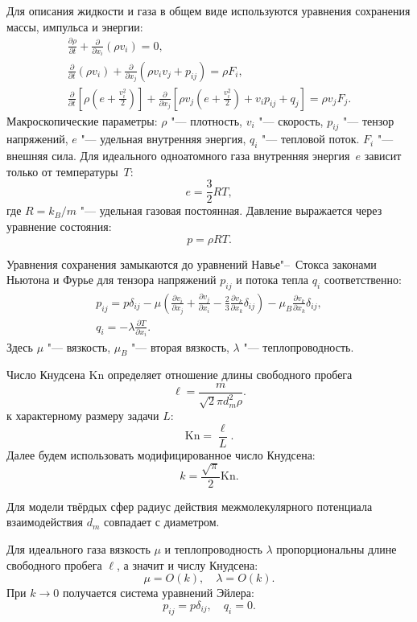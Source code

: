 \documentclass[english,russian,a4paper,10pt]{article}
\newcommand{\Kn}{\mathrm{Kn}}
\newcommand{\pder}[2][]{\frac{\partial#1}{\partial#2}}
\begin{document}
Для описания жидкости и газа в общем виде используются уравнения сохранения массы, импульса и энергии:
\begin{gather}
	\pder[\rho]{t} + \pder{x_i}(\rho v_i) = 0, \label{eq:mass}\\
	\pder{t}(\rho v_i) + \pder{x_j}(\rho v_i v_j + p_{ij}) = \rho F_i, \label{eq:momentum}\\
	\pder{t}\left[\rho\left(e+\frac{v_i^2}2\right)\right] +
		\pder{x_j}\left[\rho v_j\left(e+\frac{v_i^2}2\right)+v_i p_{ij}+q_j\right] = \rho v_j F_j. \label{eq:energy}
\end{gather}
Макроскопические параметры: \(\rho\) "--- плотность, \(v_i\) "--- скорость, \(p_{ij}\) "--- тензор напряжений,
\(e\) "--- удельная внутренняя энергия, \(q_i\) "--- тепловой поток. \(F_i\) "--- внешняя сила.
Для идеального одноатомного газа внутренняя энергия~\(e\) зависит только от температуры~\(T\):
\[ e = \frac32RT,\]
где \(R=k_B/m\) "--- удельная газовая постоянная. Давление выражается через уравнение состояния:
\[ p = \rho RT. \]

Уравнения сохранения замыкаются до уравнений Навье"--~Стокса законами Ньютона и Фурье
для тензора напряжений \(p_{ij}\) и потока тепла \(q_i\) соответственно:
\begin{gather}
	p_{ij} = p\delta_{ij} - \mu\left(\pder[v_i]{x_j}+\pder[v_j]{x_i}-\frac23\pder[v_k]{x_k}\delta_{ij}\right) -
		\mu_B\pder[v_k]{x_k}\delta_{ij}, \label{eq:stress_tensor}\\
	q_i = -\lambda\pder[T]{x_i}. \label{eq:heat_flow}
\end{gather}
Здесь \(\mu\) "--- вязкость, \(\mu_B\) "--- вторая вязкость, \(\lambda\) "--- теплопроводность.

Число Кнудсена \(\Kn\) определяет отношение длины свободного пробега
\begin{equation}\label{eq:ell}
	\ell = \frac{m}{\sqrt2\pi d_m^2 \rho}.
\end{equation}
к характерному размеру задачи \(L\):
\begin{equation}\label{eq:Knudsen}
	\Kn = \frac{\ell}L.
\end{equation}
Далее будем использовать модифицированное число Кнудсена:
\begin{equation}
	k = \frac{\sqrt\pi}2\Kn.
\end{equation}

Для модели твёрдых сфер радиус действия межмолекулярного потенциала взаимодействия \(d_m\)
совпадает с диаметром.

Для идеального газа вязкость \(\mu\) и теплопроводность \(\lambda\)
пропорциональны длине свободного пробега \(\ell\), а значит и числу Кнудсена:
\begin{equation}
	\mu = O(k), \quad \lambda = O(k).
\end{equation}
При \(k\to0\) получается система уравнений Эйлера:
\begin{equation}
	p_{ij} = p\delta_{ij}, \quad q_i = 0.
\end{equation}
\end{document}
